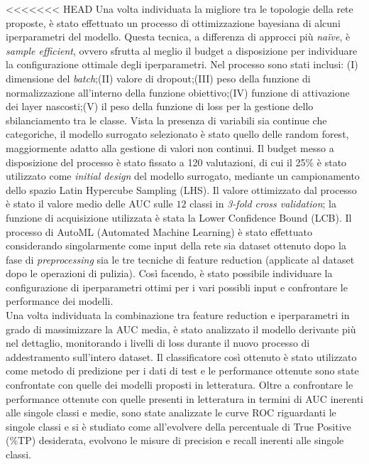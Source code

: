 <<<<<<< HEAD
Una volta individuata la migliore tra le topologie della rete proposte, è stato effettuato un processo di ottimizzazione bayesiana di alcuni iperparametri del modello. 
Questa tecnica, a differenza di approcci più \textit{na\"ive}, è \textit{sample efficient}, ovvero sfrutta al meglio il budget a disposizione per individuare la configurazione ottimale degli iperparametri. Nel processo sono stati inclusi: (I) dimensione del \textit{batch};(II) valore di dropout;(III) peso della funzione di normalizzazione all'interno della funzione obiettivo;(IV) funzione di attivazione dei layer nascosti;(V) il peso della funzione di loss per la gestione dello sbilanciamento tra le classe.
Vista la presenza di variabili sia continue che categoriche, il modello surrogato selezionato è stato quello delle random forest, maggiormente adatto alla gestione di valori non continui. 
Il budget messo a disposizione del processo è stato fissato a 120 valutazioni, di cui il 25\% è stato utilizzato come \textit{initial design} del modello surrogato, mediante un campionamento dello spazio Latin Hypercube Sampling (LHS). Il valore ottimizzato dal processo è stato il valore medio delle AUC sulle $12$ classi in \textit{3-fold cross validation}; la funzione di acquisizione utilizzata è stata la Lower Confidence Bound (LCB).
Il processo di AutoML (Automated Machine Learning) è stato effettuato considerando singolarmente come input della rete sia dataset ottenuto dopo la fase di \textit{preprocessing} sia le tre tecniche di feature reduction (applicate al dataset dopo le operazioni di pulizia).
Così facendo, è stato possibile individuare la configurazione di iperparametri ottimi per i vari possibli input e confrontare le performance dei modelli.\\ 
Una volta individuata la combinazione tra feature reduction e iperparametri in grado di massimizzare la AUC media, è stato analizzato il modello derivante più nel dettaglio, monitorando i livelli di loss durante il nuovo processo di addestramento sull'intero dataset.
Il classificatore così ottenuto è stato utilizzato come metodo di predizione per i dati di test e le performance ottenute sono state confrontate con quelle dei modelli proposti in letteratura.
Oltre a confrontare le performance ottenute con quelle presenti in letteratura in termini di AUC inerenti alle singole classi e medie, sono state analizzate le curve ROC riguardanti le singole classi e si è studiato come all'evolvere della percentuale di True Positive (\%TP) desiderata, evolvono le misure di precision e recall inerenti alle singole classi.
